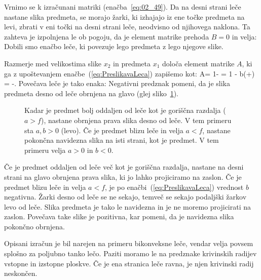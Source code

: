 Vrnimo se k izračunani matriki (enačba~\ref{eq:02_49}).
Da na desni strani leče nastane slika predmeta, se morajo 
žarki, ki izhajajo iz ene točke predmeta na levi, zbrati
v eni točki na desni strani leče, neodvisno od njihovega naklona.
Ta zahteva je izpolnjena le ob pogoju, da je element matrike prehoda $B = 0$ in velja:
Dobili smo enačbo leče, ki povezuje lego predmeta z lego njegove slike.

Razmerje med velikostima slike $x_2$ in predmeta $x_1$ določa
element matrike $A$, ki ga z upoštevanjem enačbe~(\ref{eq:PreslikavaLeca})
zapišemo kot:
\beq
A= 1- = 1 - b\left(+\right) = -.
\label{eq:02_50}
\eeq
Povečava leče je tako enaka:
Negativni predznak pomeni, da je slika predmeta desno od leče obrnjena na glavo
(glej sliko~\ref{fig:02_slikazaleco}).
\begin{figure}[!ht]
\centering
\def\svgwidth{140truemm} 

\caption{Kadar je predmet bolj oddaljen od leče kot je goriščna razdalja ($a>f$),
nastane obrnjena prava slika desno od leče. 
V tem primeru sta $a,b>0$ (levo). Če je predmet blizu leče in velja $a<f$,
nastane pokončna navidezna slika na isti strani, kot je predmet. V tem primeru velja $a>0$ in $b<0$.}
\label{fig:02_slikazaleco}
\end{figure}

Če je predmet oddaljen od leče več kot je goriščna razdalja, nastane na desni
strani na glavo obrnjena prava slika, ki jo lahko projiciramo na zaslon. Če je 
predmet blizu leče in velja $a<f$, je po enačbi~(\ref{eq:PreslikavaLeca}) 
vrednost $b$ negativna. Žarki desno od leče se ne sekajo, temveč se sekajo podaljški 
žarkov levo od leče. Slika predmeta je tako le navidezna in je
ne moremo projicirati na zaslon. Povečava take slike je pozitivna, 
kar pomeni, da je navidezna slika pokončno obrnjena.

Opisani izračun je bil narejen na primeru bikonveksne leče, vendar velja
povsem splošno za poljubno tanko lečo. Paziti moramo le na predznake krivinskih
radijev vstopne in izstopne ploskve. Če je ena stranica leče ravna, je 
njen krivinski radij neskončen. 

